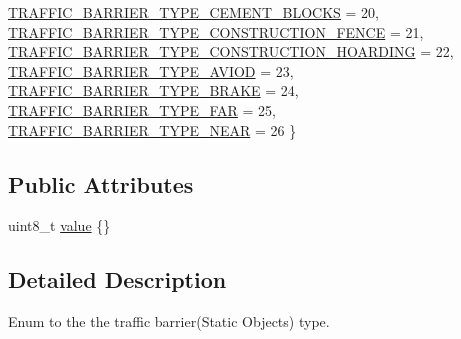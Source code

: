 \begin{DoxyCompactItemize}
\newline
\hyperlink{structmaf__perception__interface_1_1TrafficBarrierTypeEnum_abee6f329801e5b0612e62bc96e117134a4d5514599259999572726e45889107d6}{T\+R\+A\+F\+F\+I\+C\+\_\+\+B\+A\+R\+R\+I\+E\+R\+\_\+\+T\+Y\+P\+E\+\_\+\+C\+E\+M\+E\+N\+T\+\_\+\+B\+L\+O\+C\+KS} = 20, 
\hyperlink{structmaf__perception__interface_1_1TrafficBarrierTypeEnum_abee6f329801e5b0612e62bc96e117134a8f1b35c709a85bd4c8a18cd3b8d43d29}{T\+R\+A\+F\+F\+I\+C\+\_\+\+B\+A\+R\+R\+I\+E\+R\+\_\+\+T\+Y\+P\+E\+\_\+\+C\+O\+N\+S\+T\+R\+U\+C\+T\+I\+O\+N\+\_\+\+F\+E\+N\+CE} = 21, 
\hyperlink{structmaf__perception__interface_1_1TrafficBarrierTypeEnum_abee6f329801e5b0612e62bc96e117134ad6f7fa7f630edb59e11433763f03d7de}{T\+R\+A\+F\+F\+I\+C\+\_\+\+B\+A\+R\+R\+I\+E\+R\+\_\+\+T\+Y\+P\+E\+\_\+\+C\+O\+N\+S\+T\+R\+U\+C\+T\+I\+O\+N\+\_\+\+H\+O\+A\+R\+D\+I\+NG} = 22, 
\hyperlink{structmaf__perception__interface_1_1TrafficBarrierTypeEnum_abee6f329801e5b0612e62bc96e117134afa495e8d8eff08c7e1857104d27e266f}{T\+R\+A\+F\+F\+I\+C\+\_\+\+B\+A\+R\+R\+I\+E\+R\+\_\+\+T\+Y\+P\+E\+\_\+\+A\+V\+I\+OD} = 23, 
\newline
\hyperlink{structmaf__perception__interface_1_1TrafficBarrierTypeEnum_abee6f329801e5b0612e62bc96e117134a628481d7eb5b4563ac44f4e0fcae652b}{T\+R\+A\+F\+F\+I\+C\+\_\+\+B\+A\+R\+R\+I\+E\+R\+\_\+\+T\+Y\+P\+E\+\_\+\+B\+R\+A\+KE} = 24, 
\hyperlink{structmaf__perception__interface_1_1TrafficBarrierTypeEnum_abee6f329801e5b0612e62bc96e117134ab6d9ce920ce0a7919ee1a6ebf40a48f6}{T\+R\+A\+F\+F\+I\+C\+\_\+\+B\+A\+R\+R\+I\+E\+R\+\_\+\+T\+Y\+P\+E\+\_\+\+F\+AR} = 25, 
\hyperlink{structmaf__perception__interface_1_1TrafficBarrierTypeEnum_abee6f329801e5b0612e62bc96e117134a79735a07e3d08fd9a72e5aaf81fe8881}{T\+R\+A\+F\+F\+I\+C\+\_\+\+B\+A\+R\+R\+I\+E\+R\+\_\+\+T\+Y\+P\+E\+\_\+\+N\+E\+AR} = 26
 \}
\end{DoxyCompactItemize}
\subsection*{Public Attributes}
\begin{DoxyCompactItemize}
\item 
uint8\+\_\+t \hyperlink{structmaf__perception__interface_1_1TrafficBarrierTypeEnum_a2727ea2d91fbe2c28516b1cf93d1f37c}{value} \{\}
\end{DoxyCompactItemize}


\subsection{Detailed Description}
Enum to the the traffic barrier(\+Static Objects) type. 

